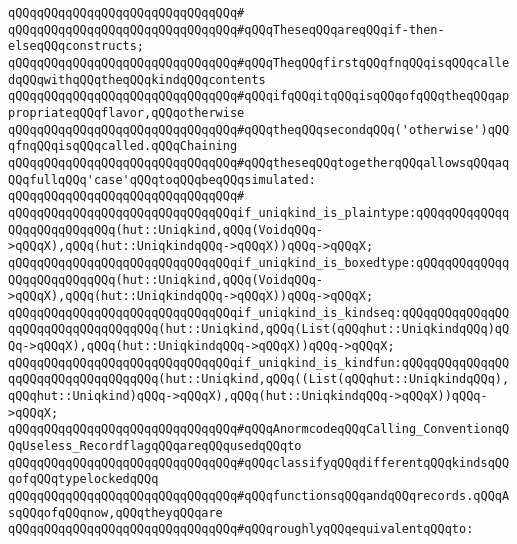 \verb|qQQqqQQqqQQqqQQqqQQqqQQqqQQqqQQq#|\newline
\verb|qQQqqQQqqQQqqQQqqQQqqQQqqQQqqQQq#qQQqTheseqQQqareqQQqif-then-elseqQQqconstructs;|\newline
\verb|qQQqqQQqqQQqqQQqqQQqqQQqqQQqqQQq#qQQqTheqQQqfirstqQQqfnqQQqisqQQqcalledqQQqwithqQQqtheqQQqkindqQQqcontents|\newline
\verb|qQQqqQQqqQQqqQQqqQQqqQQqqQQqqQQq#qQQqifqQQqitqQQqisqQQqofqQQqtheqQQqappropriateqQQqflavor,qQQqotherwise|\newline
\verb|qQQqqQQqqQQqqQQqqQQqqQQqqQQqqQQq#qQQqtheqQQqsecondqQQq('otherwise')qQQqfnqQQqisqQQqcalled.qQQqChaining|\newline
\verb|qQQqqQQqqQQqqQQqqQQqqQQqqQQqqQQq#qQQqtheseqQQqtogetherqQQqallowsqQQqaqQQqfullqQQq'case'qQQqtoqQQqbeqQQqsimulated:|\newline
\verb|qQQqqQQqqQQqqQQqqQQqqQQqqQQqqQQq#|\newline
\verb|qQQqqQQqqQQqqQQqqQQqqQQqqQQqqQQqif_uniqkind_is_plaintype:qQQqqQQqqQQqqQQqqQQqqQQqqQQq(hut::Uniqkind,qQQq(VoidqQQq->qQQqX),qQQq(hut::UniqkindqQQq->qQQqX))qQQq->qQQqX;|\newline
\verb|qQQqqQQqqQQqqQQqqQQqqQQqqQQqqQQqif_uniqkind_is_boxedtype:qQQqqQQqqQQqqQQqqQQqqQQqqQQq(hut::Uniqkind,qQQq(VoidqQQq->qQQqX),qQQq(hut::UniqkindqQQq->qQQqX))qQQq->qQQqX;|\newline
\verb|qQQqqQQqqQQqqQQqqQQqqQQqqQQqqQQqif_uniqkind_is_kindseq:qQQqqQQqqQQqqQQqqQQqqQQqqQQqqQQqqQQq(hut::Uniqkind,qQQq(List(qQQqhut::UniqkindqQQq)qQQq->qQQqX),qQQq(hut::UniqkindqQQq->qQQqX))qQQq->qQQqX;|\newline
\verb|qQQqqQQqqQQqqQQqqQQqqQQqqQQqqQQqif_uniqkind_is_kindfun:qQQqqQQqqQQqqQQqqQQqqQQqqQQqqQQqqQQq(hut::Uniqkind,qQQq((List(qQQqhut::UniqkindqQQq),qQQqhut::Uniqkind)qQQq->qQQqX),qQQq(hut::UniqkindqQQq->qQQqX))qQQq->qQQqX;|\newline
\newline
\newline
\newline
\verb|qQQqqQQqqQQqqQQqqQQqqQQqqQQqqQQq#qQQqAnormcodeqQQqCalling_ConventionqQQqUseless_RecordflagqQQqareqQQqusedqQQqto|\newline
\verb|qQQqqQQqqQQqqQQqqQQqqQQqqQQqqQQq#qQQqclassifyqQQqdifferentqQQqkindsqQQqofqQQqtypelockedqQQq|\newline
\verb|qQQqqQQqqQQqqQQqqQQqqQQqqQQqqQQq#qQQqfunctionsqQQqandqQQqrecords.qQQqAsqQQqofqQQqnow,qQQqtheyqQQqare|\newline
\verb|qQQqqQQqqQQqqQQqqQQqqQQqqQQqqQQq#qQQqroughlyqQQqequivalentqQQqto:|\newline
